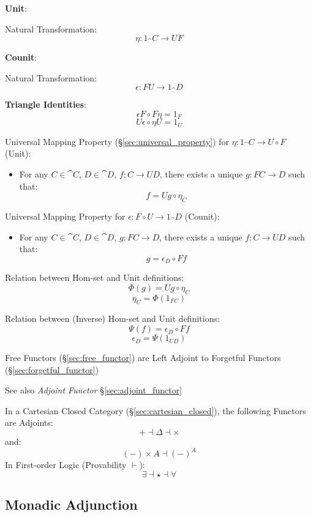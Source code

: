 \textbf{Unit}:

Natural Transformation:
\[
  \eta : 1_\cat{C} \rightarrow U F
\]

\textbf{Counit}:

Natural Transformation:
\[
  \epsilon : F U \rightarrow 1_\cat{D}
\]

\textbf{Triangle Identities}:
\[
  \epsilon F \circ F \eta = 1_F
\]\[
  U \epsilon \circ \eta U = 1_U
\]

Universal Mapping Property (\S\ref{sec:universal_property}) for $\eta
: 1_\cat{C} \rightarrow U \circ F$ (Unit):

\begin{itemize}
\item For any $C \in \cat{C}$, $D \in \cat{D}$, $f : C
  \rightarrow U D$, there exists a unique $g : FC \rightarrow D$ such
  that:
  \[
    f = U g \circ \eta_C
  \]
\end{itemize}

Universal Mapping Property for $\epsilon : F \circ U \rightarrow
1_\cat{D}$ (Counit):

\begin{itemize}
\item For any $C \in \cat{C}$, $D \in \cat{D}$, $g : F C
  \rightarrow D$, there exists a unique $f : C \rightarrow U D$ such
  that:
  \[
    g = \epsilon_D \circ F f
  \]
\end{itemize}

Relation between Hom-set and Unit definitions:
\[
  \Phi(g) = U g \circ \eta_C
\]\[
  \eta_C = \Phi(1_{FC})
\]

Relation between (Inverse) Hom-set and Unit definitions:
\[
  \Psi (f) = \epsilon_D \circ F f
\]\[
  \epsilon_D = \Psi(1_{U D})
\]

Free Functors (\S\ref{sec:free_functor}) are Left Adjoint to Forgetful
Functors (\S\ref{sec:forgetful_functor})

See also \emph{Adjoint Functor} \S\ref{sec:adjoint_functor}

In a Cartesian Closed Category (\S\ref{sec:cartesian_closed}), the
following Functors are Adjoints:
\[
  + \dashv \Delta \dashv \times
\]
and:
\[
  (-) \times A \dashv (-)^A
\]
In First-order Logic (Provability $\vdash$):
\[
  \exists \dashv \star \dashv \forall
\]



\subsection{Monadic Adjunction}\label{sec:monadic_adjunction}

